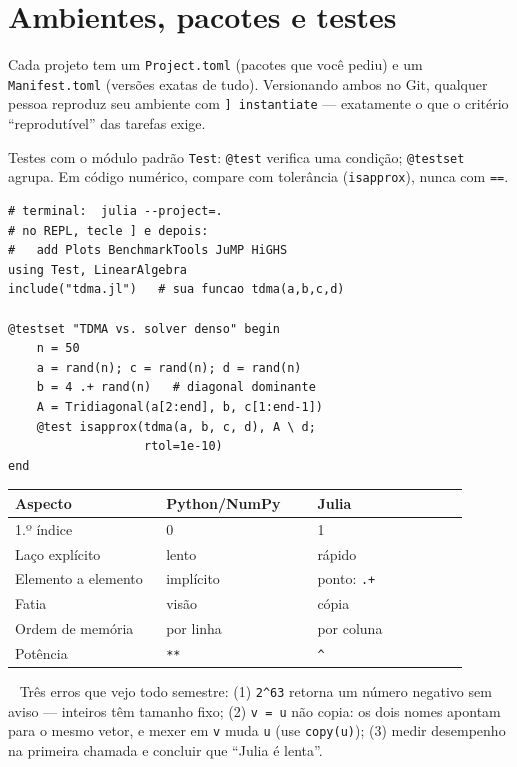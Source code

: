 \documentclass[10pt,a4paper,twocolumn,openany]{report}
\newcommand{\lead}[2]{\par\medskip\noindent{\color{#1}\bfseries #2}\ }
\newenvironment{conceito}[1]{\section{#1}}{\par}
\newenvironment{armadilha}{\lead{vermelho}{Armadilha clássica.}}{\par\medskip}
\begin{document}
\begin{conceito}{Ambientes, pacotes e testes}
Cada projeto tem um \texttt{Project.toml} (pacotes que você pediu) e um
\texttt{Manifest.toml} (versões exatas de tudo). Versionando ambos no Git,
qualquer pessoa reproduz seu ambiente com \texttt{] instantiate} ---
exatamente o que o critério ``reprodutível'' das tarefas exige.

Testes com o módulo padrão \texttt{Test}: \texttt{@test} verifica uma
condição; \texttt{@testset} agrupa. Em código numérico, compare com
tolerância (\texttt{isapprox}), nunca com \texttt{==}.
\end{conceito}

\begin{lstlisting}[caption={Ambiente e teste do TDMA}]
# terminal:  julia --project=.
# no REPL, tecle ] e depois:
#   add Plots BenchmarkTools JuMP HiGHS
using Test, LinearAlgebra
include("tdma.jl")   # sua funcao tdma(a,b,c,d)

@testset "TDMA vs. solver denso" begin
    n = 50
    a = rand(n); c = rand(n); d = rand(n)
    b = 4 .+ rand(n)   # diagonal dominante
    A = Tridiagonal(a[2:end], b, c[1:end-1])
    @test isapprox(tdma(a, b, c, d), A \ d;
                   rtol=1e-10)
end
\end{lstlisting}

\begin{center}\small
\begin{tabular}{@{}p{0.30\linewidth}p{0.30\linewidth}p{0.30\linewidth}@{}}
\toprule
Aspecto & Python/NumPy & Julia\\ \midrule
1.º índice & 0 & 1\\
Laço explícito & lento & rápido\\
Elemento a elemento & implícito & ponto: \texttt{.+}\\
Fatia & visão & cópia\\
Ordem de memória & por linha & por coluna\\
Potência & \texttt{**} & \texttt{\^{}}\\
\bottomrule
\end{tabular}
\end{center}

\begin{armadilha}
Três erros que vejo todo semestre: (1) \texttt{2\^{}63} retorna um número
negativo sem aviso --- inteiros têm tamanho fixo; (2) \texttt{v = u} não
copia: os dois nomes apontam para o mesmo vetor, e mexer em \texttt{v}
muda \texttt{u} (use \texttt{copy(u)}); (3) medir desempenho na primeira
chamada e concluir que ``Julia é lenta''.
\end{armadilha}
\end{document}
